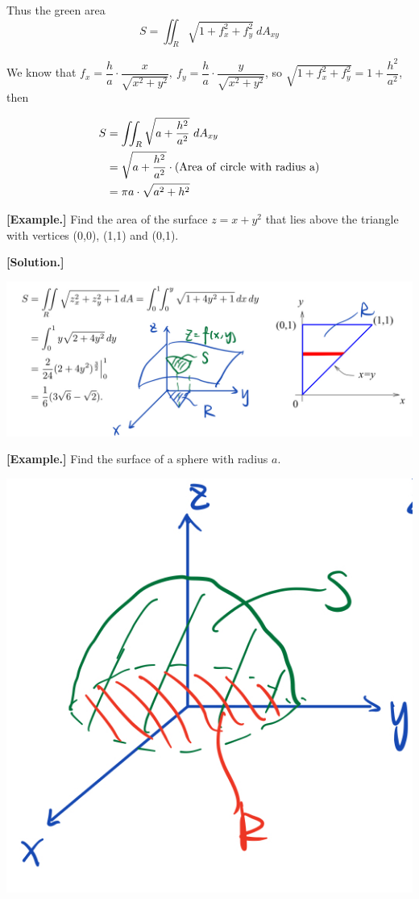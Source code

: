 \documentclass[11pt, a4paper]{MATH2023}
\newcommand{\eg}{\textbf{[Example.] }}
\newcommand{\sol}{\textbf{[Solution.] }}
\begin{document}
\begin{spacing}{1.3}
    Thus the green area $$S=\iint_R\sqrt{1+f_x^2+f_y^2}\ dA_{xy}$$

    We know that $f_x=\dfrac{h}{a}\cdot \dfrac{x}{\sqrt{x^2+y^2}},\ f_y=\dfrac{h}{a}\cdot \dfrac{y}{\sqrt{x^2+y^2}}$, so 
    $\sqrt{1+f_x^2+f_y^2}=1+\dfrac{h^2}{a^2}$, then

    \begin{align*}
        S &= \iint_R \sqrt{a+\frac{h^2}{a^2}}\ dA_{xy}\\ 
          &= \sqrt{a+\frac{h^2}{a^2}} \cdot {\rm (Area\ of\ circle\ with\ radius\ a)}\\
          &= \pi a\cdot \sqrt{a^2+h^2}
    \end{align*}

    \vspace{0.5in}
    \eg Find the area of the surface $z=x+y^2$ that lies above the triangle with vertices (0,0), (1,1)
    and (0,1).

    \sol 
    \begin{center}
        \includegraphics[scale=0.3]{images/Ch14-surface-area-eg3.jpeg}
    \end{center}


    \newpage
    \eg Find the surface of a sphere with radius $a$.
    \begin{center}
        \includegraphics[scale=0.25]{images/Ch14-surface-area-eg4.jpeg}
    \end{center}


\end{spacing}
\end{document}
